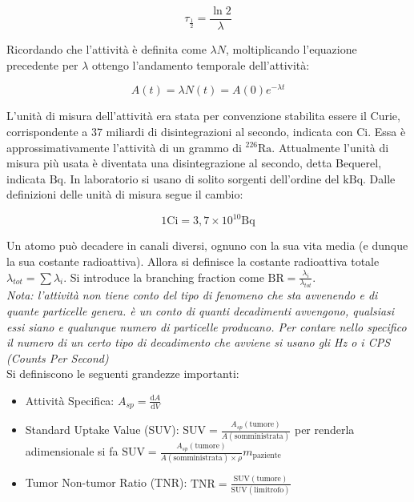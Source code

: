 \begin{equation}
\tau_{\frac{1}{2}}=\frac{\ln2}{\lambda}
\end{equation}

Ricordando che l'attività è definita come $\lambda N$, moltiplicando l'equazione precedente per $\lambda$ ottengo l'andamento temporale dell'attività:

\begin{equation}
A(t)=\lambda N(t)=A(0)e^{-\lambda t}
\end{equation}

L'unità di misura dell'attività era stata per convenzione stabilita essere il Curie, corrispondente a 37 miliardi di disintegrazioni al secondo, indicata con $\text{Ci}$. Essa è approssimativamente l'attività di un grammo di $^{226}\text{Ra}$.
Attualmente l'unità di misura più usata è diventata una disintegrazione al secondo, detta Bequerel, indicata $\text{Bq}$.
In laboratorio si usano di solito sorgenti dell'ordine del $\text{kBq}$. Dalle definizioni delle unità di misura segue il cambio:

\begin{equation}
1 \text{Ci} = 3,7 \times 10^{10} \text{Bq}
\end{equation}

Un atomo può decadere in canali diversi, ognuno con la sua vita media (e dunque la sua costante radioattiva). Allora si definisce la costante radioattiva totale $\lambda_{tot}=\sum \lambda_{i}$. Si introduce la branching fraction come $\text{BR}=\frac{\lambda_i}{\lambda_{tot}}$.\\

\emph{Nota: l'attività non tiene conto del tipo di fenomeno che sta avvenendo e di quante particelle genera. è un conto di quanti decadimenti avvengono, qualsiasi essi siano e qualunque numero di particelle producano. Per contare nello specifico il numero di un certo tipo di decadimento che avviene si usano gli Hz o i CPS (Counts Per Second)}\\

Si definiscono le seguenti grandezze importanti:
\begin{itemize}
\item Attività Specifica: $A_{sp}=\frac{\mathrm{d}A}{\mathrm{d}V}$
\item Standard Uptake Value (SUV): $\text{SUV}=\frac{A_{sp}(\text{tumore})}{A(\text{somministrata})}$ per renderla adimensionale si fa $\text{SUV}=\frac{A_{sp}(\text{tumore})}{A(\text{somministrata})\times \rho}m_{\text{paziente}}$
\item Tumor Non-tumor Ratio (TNR): $\text{TNR}=\frac{\text{SUV}(\text{tumore})}{\text{SUV}(\text{limitrofo})}$
\end{itemize}

